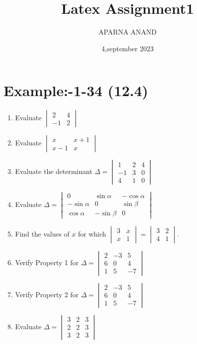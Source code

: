 \documentclass{article}
\theoremstyle{remark}
\begin{document}
\title{Latex Assignment1}                            \author{APARNA ANAND}
\date{4,september 2023}
\maketitle
\section*{Example:-1-34 (12.4)}
\begin{enumerate}
\item Evaluate $\begin{vmatrix}2&4\\ -1&2\end{vmatrix}$
\item Evaluate $\begin{vmatrix}x&x+1\\ x-1&x\end{vmatrix}$
\item Evaluate the determinant $\Delta =\begin{vmatrix}1&2&4\\-1&3&0\\4&1&0\end{vmatrix}$
\item Evaluate $\Delta= \begin{vmatrix}0&\sin\alpha&-\cos\alpha\\ -\sin\alpha&0&\sin\beta\\ \cos\alpha& -\sin\beta&0\end{vmatrix}$
\item Find the values of $x$ for which $\begin{vmatrix}3&x\\x&1\end{vmatrix}= \begin{vmatrix}3&2\\4&1\end{vmatrix}$.
\item Verify Property 1 for $\Delta=\begin{vmatrix}2 &- 3 & 5\\6 & 0 & 4\\1 & 5 & -7\end{vmatrix}$
\item Verify Property 2 for $\Delta=\begin{vmatrix}2&-3&5\\6&0&4\\1&5&-7 \end{vmatrix}$
\item Evaluate $\Delta=\begin{vmatrix}3&2&3\\2&2&3\\3&2&3\end{vmatrix}$

\end{enumerate}
\end{document}

